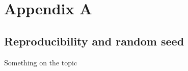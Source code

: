 
\chapter{Appendix A}

\section{Reproducibility and random seed}

Something on the topic



\endinput